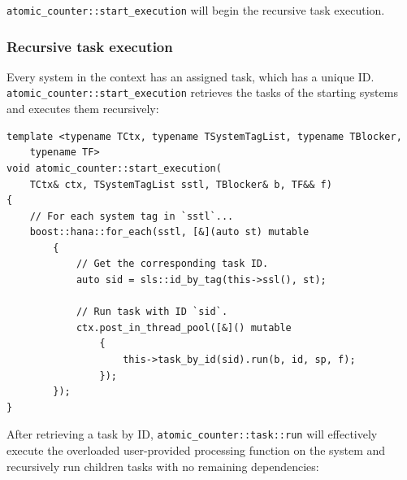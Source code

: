 \documentclass[twoside, 12pt, a4paper, openany]{book}
\begin{document}
\texttt{atomic_counter::start_execution}
will begin the recursive task execution.

\hypertarget{multithreading_recursive_task_execution}{\subsubsection{Recursive
task execution}\label{multithreading_recursive_task_execution}}

Every system in the context has an assigned task, which has a unique ID.
\texttt{atomic_counter::start_execution}
retrieves the tasks of the starting systems and executes them
recursively:

\begin{verbatim}
template <typename TCtx, typename TSystemTagList, typename TBlocker,
    typename TF>
void atomic_counter::start_execution(
    TCtx& ctx, TSystemTagList sstl, TBlocker& b, TF&& f)
{
    // For each system tag in `sstl`...
    boost::hana::for_each(sstl, [&](auto st) mutable
        {
            // Get the corresponding task ID.
            auto sid = sls::id_by_tag(this->ssl(), st);

            // Run task with ID `sid`.
            ctx.post_in_thread_pool([&]() mutable
                {
                    this->task_by_id(sid).run(b, id, sp, f);
                });
        });
}
\end{verbatim}

After retrieving a task by ID,
\texttt{atomic_counter::task::run}
will effectively execute the overloaded user-provided processing
function on the system and recursively run children tasks with no
remaining dependencies:
\end{document}

